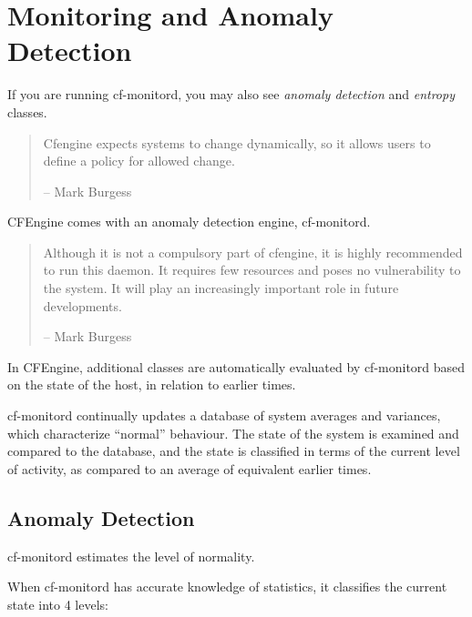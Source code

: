 



\chapter{Monitoring and Anomaly Detection}

If you are running cf-monitord, you may also see \emph{anomaly detection} and \emph{entropy} classes.

\begin{quotation}
Cfengine expects systems to change dynamically, so it allows users to define a policy for allowed change.

-- Mark Burgess
\end{quotation}

CFEngine comes with an anomaly detection engine, cf-monitord.

\begin{quotation}
Although it is not a compulsory part of cfengine, it is highly recommended to run this daemon. It requires few resources and poses no vulnerability to the system. It will play an increasingly important role in future developments.

-- Mark Burgess
\end{quotation}

In CFEngine,  additional classes are automatically evaluated by cf-monitord based on the state of the host, in relation to earlier times.

cf-monitord continually updates a database of system averages and variances, which characterize
``normal'' behaviour. The state of the system is examined and compared to the database,
and the state is classified in terms of the current level of activity, as compared to an average
of equivalent earlier times.

\section{Anomaly Detection}

cf-monitord estimates the level of normality.

When cf-monitord has accurate knowledge of statistics, it classifies the current state into 4 levels:

